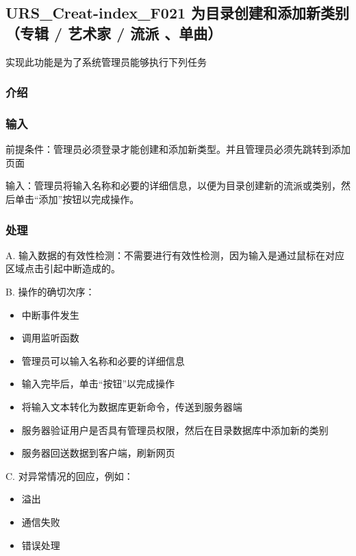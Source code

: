    \subsection{URS\_Creat-index\_F021 为目录创建和添加新类别（专辑 / 艺术家 / 流派 、单曲）}
   实现此功能是为了系统管理员能够执行下列任务
   \subsubsection{介绍}


   \subsubsection{输入}
   前提条件：管理员必须登录才能创建和添加新类型。并且管理员必须先跳转到添加页面

   输入：管理员将输入名称和必要的详细信息，以便为目录创建新的流派或类别，然后单击“添加”按钮以完成操作。
   
   \subsubsection{处理}
   

   
   A. 输入数据的有效性检测：不需要进行有效性检测，因为输入是通过鼠标在对应区域点击引起中断造成的。
   
   B. 操作的确切次序：
   \begin{adjustwidth}{2cm}{1cm}\qquad
	   \begin{itemize}
		   \item 中断事件发生
		   \item 调用监听函数
		   \item 管理员可以输入名称和必要的详细信息
		   \item 输入完毕后，单击“按钮”以完成操作
		   \item 将输入文本转化为数据库更新命令，传送到服务器端
		   \item 服务器验证用户是否具有管理员权限，然后在目录数据库中添加新的类别
		   \item 服务器回送数据到客户端，刷新网页
	   \end{itemize}		
   \end{adjustwidth}
	
   
   C. 对异常情况的回应，例如：
   \begin{adjustwidth}{2cm}{1cm}\qquad
	   \begin{itemize}
		   \item 溢出
		   \item 通信失败
		   \item 错误处理
	   \end{itemize}		
   \end{adjustwidth}
   
